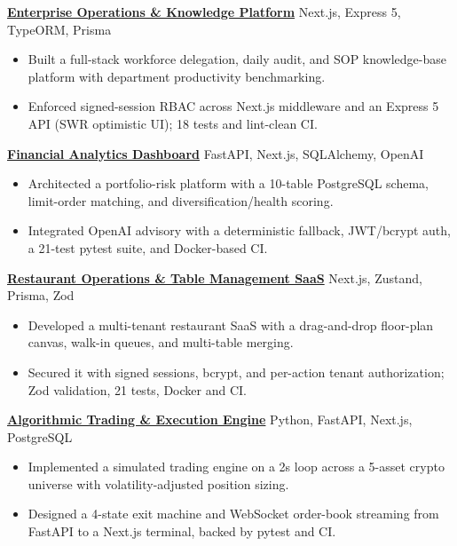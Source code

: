 \documentclass[a4paper]{article}
\newcommand{\entry}[2]{%
    {\fontsize{9.2}{11.5}\textbf{#1}} \hfill {\fontsize{8.4}{10.6}\selectfont #2} \par
}
\newcommand{\desc}[1]{%
    {\fontsize{8.0}{10.2}\selectfont #1}%
}
\begin{document}
\entry{\href{https://github.com/yigitsarpavci/enterprise-admin-dashboard}{Enterprise Operations \& Knowledge Platform}}{Next.js, Express 5, TypeORM, Prisma}
\begin{itemize}[leftmargin=1.1em, itemsep=0.5pt, parsep=0pt, topsep=0.6pt]
   \item \desc{Built a full-stack workforce delegation, daily audit, and SOP knowledge-base platform with department productivity benchmarking.}
   \item \desc{Enforced signed-session RBAC across Next.js middleware and an Express 5 API (SWR optimistic UI); 18 tests and lint-clean CI.}
\end{itemize}
\vspace{1.5pt}

\entry{\href{https://github.com/yigitsarpavci/financial-analytics-dashboard}{Financial Analytics Dashboard}}{FastAPI, Next.js, SQLAlchemy, OpenAI}
\begin{itemize}[leftmargin=1.1em, itemsep=0.5pt, parsep=0pt, topsep=0.6pt]
   \item \desc{Architected a portfolio-risk platform with a 10-table PostgreSQL schema, limit-order matching, and diversification/health scoring.}
   \item \desc{Integrated OpenAI advisory with a deterministic fallback, JWT/bcrypt auth, a 21-test pytest suite, and Docker-based CI.}
\end{itemize}
\vspace{1.5pt}

\entry{\href{https://github.com/yigitsarpavci/restaurant-floor-plan-saas}{Restaurant Operations \& Table Management SaaS}}{Next.js, Zustand, Prisma, Zod}
\begin{itemize}[leftmargin=1.1em, itemsep=0.5pt, parsep=0pt, topsep=0.6pt]
   \item \desc{Developed a multi-tenant restaurant SaaS with a drag-and-drop floor-plan canvas, walk-in queues, and multi-table merging.}
   \item \desc{Secured it with signed sessions, bcrypt, and per-action tenant authorization; Zod validation, 21 tests, Docker and CI.}
\end{itemize}
\vspace{1.5pt}

\entry{\href{https://github.com/yigitsarpavci/algorithmic-trading-simulator}{Algorithmic Trading \& Execution Engine}}{Python, FastAPI, Next.js, PostgreSQL}
\begin{itemize}[leftmargin=1.1em, itemsep=0.5pt, parsep=0pt, topsep=0.6pt]
   \item \desc{Implemented a simulated trading engine on a 2s loop across a 5-asset crypto universe with volatility-adjusted position sizing.}
   \item \desc{Designed a 4-state exit machine and WebSocket order-book streaming from FastAPI to a Next.js terminal, backed by pytest and CI.}
\end{itemize}
\vspace{1.5pt}
\end{document}

